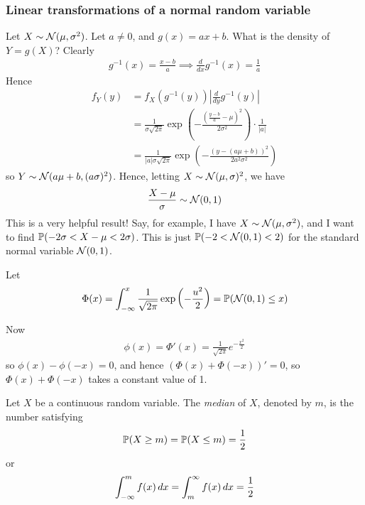 \documentclass{../../template/note}
\begin{document}
    \subsubsection{Linear transformations of a normal random variable}

    Let \(X \sim \mathcal{N}(\mu, \sigma^2)\). Let \(a \neq 0\), and \(g(x) = ax + b\). What is the density of \(Y = g(X)\)? Clearly
    \begin{align*}
        g^{-1}(x) = \frac{x-b}a \implies \frac d{dx}g^{-1}(x) = \frac 1 a
    \end{align*}
    Hence
    \begin{align*}
        f_Y(y) &= f_X(g^{-1}(y)) \left|\frac{d}{dy}g^{-1}(y)\right| \\
        &= \frac{1}{\sigma \sqrt{2\pi}} \exp\left(-\frac{(\frac{y-b}{a}-\mu)^2}{2\sigma^2}\right) \cdot \frac 1 {|a|} \\
        &= \frac{1}{|a|\sigma \sqrt{2\pi}} \exp\left(-\frac{(y-(a\mu+b))^2}{2a^2\sigma^2}\right)
    \end{align*}
    so \(Y \sim \mathcal{N}(a\mu+b, (a\sigma)^2)\). Hence, letting \(X \sim \mathcal{N}(\mu, \sigma)^2\), we have
    \begin{align*}
        \frac{X-\mu}{\sigma} \sim \mathcal{N}(0, 1)
    \end{align*}
    This is a very helpful result! Say, for example, I have \(X \sim \mathcal{N}(\mu, \sigma^2)\), and I want to find \(\mathbb P(-2\sigma < X-\mu < 2\sigma)\). This is just \(\mathbb P(-2 < \mathcal{N}(0, 1) < 2)\) for the standard normal variable \(\mathcal{N}(0, 1)\). 

    \begin{definition}
        Let 
        \begin{align*}
            \Phi(x) = \int_{-\infty}^x \frac{1}{\sqrt{2\pi}} \exp\left(-\frac{u^2}2\right) = \mathbb P(\mathcal{N}(0, 1) \leq x)
        \end{align*}
    \end{definition}
    Now
    \begin{align*}
        \phi(x) = \Phi'(x) = \frac{1}{\sqrt{2\pi}}e^{-\frac{x^2}2}
    \end{align*}
    so \(\phi(x) - \phi(-x) = 0\), and hence \((\Phi(x)+\Phi(-x))' = 0\), so \(\Phi(x) + \Phi(-x)\) takes a constant value of 1.
    
    \begin{definition}[Median]
        Let \(X\) be a continuous random variable. The \emph{median} of \(X\), denoted by \(m\), is the number satisfying
        \begin{align*}
            \mathbb P(X \geq m) = \mathbb P(X \leq m) = \frac 1 2
        \end{align*}
        or
        \begin{align*}
            \int_{-\infty}^m f(x) \,d{x} = \int_m^\infty f(x) \,d{x} = \frac 1 2
        \end{align*}
    \end{definition}
    
\end{document}
